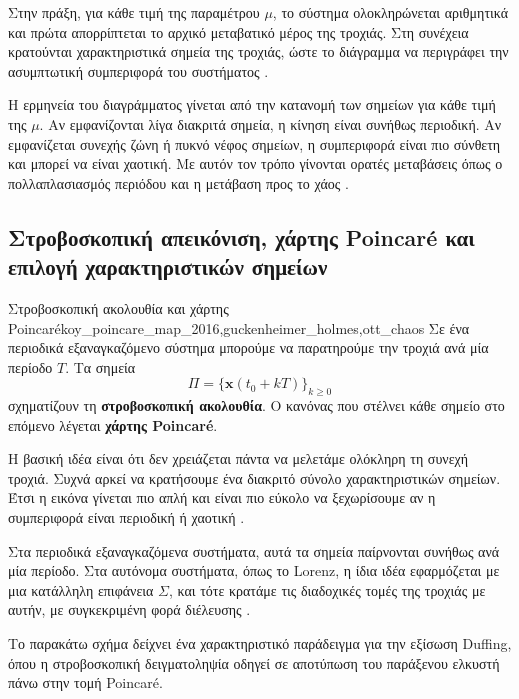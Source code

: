 \documentclass[11pt,a4paper]{report}
\begin{document}
Στην πράξη, για κάθε τιμή της παραμέτρου $\mu$, το σύστημα ολοκληρώνεται
αριθμητικά και πρώτα απορρίπτεται το αρχικό μεταβατικό μέρος της τροχιάς.
Στη συνέχεια κρατούνται χαρακτηριστικά σημεία της τροχιάς, ώστε
το διάγραμμα να περιγράφει την ασυμπτωτική συμπεριφορά του συστήματος \cite{strogatz_nonlinear,guckenheimer_holmes}.

Η ερμηνεία του διαγράμματος γίνεται από την κατανομή των σημείων για κάθε
τιμή της $\mu$. Αν εμφανίζονται λίγα διακριτά σημεία, η κίνηση είναι συνήθως
περιοδική. Αν εμφανίζεται συνεχής ζώνη ή πυκνό νέφος σημείων, η συμπεριφορά
είναι πιο σύνθετη και μπορεί να είναι χαοτική. Με αυτόν τον τρόπο γίνονται
ορατές μεταβάσεις όπως ο πολλαπλασιασμός περιόδου και η μετάβαση προς το
χάος \cite{ott_chaos,kuznetsov_bifurcation}.

\subsection{Στροβοσκοπική απεικόνιση, χάρτης Poincar\'e και επιλογή χαρακτηριστικών σημείων}
\label{subsec:poincare-and-sampling}

\begin{definitionbox}{Στροβοσκοπική ακολουθία και χάρτης Poincaré}{koy_poincare_map_2016,guckenheimer_holmes,ott_chaos}
Σε ένα περιοδικά εξαναγκαζόμενο σύστημα μπορούμε να παρατηρούμε την τροχιά
ανά μία περίοδο $T$. Τα σημεία
\begin{equation}
\Pi=\{\mathbf{x}(t_0+kT)\}_{k\ge 0}
\end{equation}
σχηματίζουν τη \textbf{στροβοσκοπική ακολουθία}. Ο κανόνας που στέλνει κάθε
σημείο στο επόμενο λέγεται \textbf{χάρτης Poincaré}.
\end{definitionbox}

Η βασική ιδέα είναι ότι δεν χρειάζεται πάντα να μελετάμε ολόκληρη τη συνεχή
τροχιά. Συχνά αρκεί να κρατήσουμε ένα διακριτό σύνολο χαρακτηριστικών σημείων.
Έτσι η εικόνα γίνεται πιο απλή και είναι πιο εύκολο να ξεχωρίσουμε αν η
συμπεριφορά είναι περιοδική ή χαοτική \cite{koy_poincare_map_2016,ott_chaos}.

Στα περιοδικά εξαναγκαζόμενα συστήματα, αυτά τα σημεία παίρνονται συνήθως ανά
μία περίοδο. Στα αυτόνομα συστήματα, όπως το Lorenz, η ίδια ιδέα εφαρμόζεται
με μια κατάλληλη επιφάνεια $\Sigma$, και τότε κρατάμε τις διαδοχικές τομές της
τροχιάς με αυτήν, με συγκεκριμένη φορά διέλευσης \cite{guckenheimer_holmes,ott_chaos}.

Το παρακάτω σχήμα δείχνει ένα χαρακτηριστικό παράδειγμα για την εξίσωση
Duffing, όπου η στροβοσκοπική δειγματοληψία οδηγεί σε αποτύπωση του παράξενου
ελκυστή πάνω στην τομή Poincaré.
\end{document}
